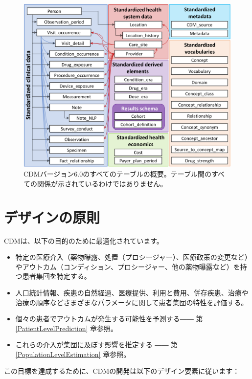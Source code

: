 \documentclass[
  11pt]{book}
\providecommand{\tightlist}{%
  \setlength{\itemsep}{0pt}\setlength{\parskip}{0pt}}
\theoremstyle{definition}
\theoremstyle{definition}
\theoremstyle{definition}
\theoremstyle{definition}
\theoremstyle{remark}
\begin{document}
\begin{figure}
\includegraphics[width=1\linewidth]{images/CommonDataModel/cdmDiagram} \caption{CDMバージョン6.0のすべてのテーブルの概要。テーブル間のすべての関係が示されているわけではありません。}\label{fig:cdmDiagram}
\end{figure}

\section{デザインの原則}\label{ux30c7ux30b6ux30a4ux30f3ux306eux539fux5247}

CDMは、以下の目的のために最適化されています。 

\begin{itemize}
\tightlist
\item
  特定の医療介入（薬物曝露、処置（プロシージャー）、医療政策の変更など）やアウトカム（コンディション、プロシージャー、他の薬物曝露など）を持つ患者集団を特定する。
\item
  人口統計情報、疾患の自然経過、医療提供、利用と費用、併存疾患、治療や治療の順序などさまざまなパラメータに関して患者集団の特性を評価する。
\item
  個々の患者でアウトカムが発生する可能性を予測する―― 第 \ref{PatientLevelPrediction} 章参照。
\item
  これらの介入が集団に及ぼす影響を推定する ―― 第 \ref{PopulationLevelEstimation} 章参照。
\end{itemize}

この目標を達成するために、CDMの開発は以下のデザイン要素に従います：
\end{document}
